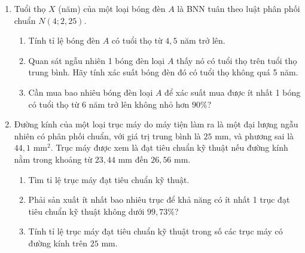 \documentclass[12pt,a4paper]{article}
\theoremstyle{definition}
\begin{document}
\begin{enumerate}[label=\textbf{\arabic*.}]
    \item Tuổi thọ $X$ (năm) của một loại bóng đèn $A$ là BNN tuân theo luật phân phối chuẩn $N(4; 2{,}25)$.
    \begin{enumerate}[label=\alph*.]
        \item Tính tỉ lệ bóng đèn $A$ có tuổi thọ từ $4{,}5$ năm trở lên.
        \item Quan sát ngẫu nhiên 1 bóng đèn loại $A$ thấy nó có tuổi thọ trên tuổi thọ trung bình. Hãy tính xác suất bóng đèn đó có tuổi thọ không quá 5 năm.
        \item Cần mua bao nhiêu bóng đèn loại $A$ để xác suất mua được ít nhất 1 bóng có tuổi thọ từ 6 năm trở lên không nhỏ hơn $90\%$?
    \end{enumerate}

    \item Đường kính của một loại trục máy do máy tiện làm ra là một đại lượng ngẫu nhiên có phân phối chuẩn, với giá trị trung bình là $25\text{ mm}$, và phương sai là $44{,}1\text{ mm}^2$. Trục máy được xem là đạt tiêu chuẩn kỹ thuật nếu đường kính nằm trong khoảng từ $23{,}44\text{ mm}$ đến $26{,}56\text{ mm}$.
    \begin{enumerate}[label=\arabic*)]
        \item Tìm tỉ lệ trục máy đạt tiêu chuẩn kỹ thuật.
        \item Phải sản xuất ít nhất bao nhiêu trục để khả năng có ít nhất 1 trục đạt tiêu chuẩn kỹ thuật không dưới $99{,}73\%$?
        \item Tính tỉ lệ trục máy đạt tiêu chuẩn kỹ thuật trong số các trục máy có đường kính trên $25\text{ mm}$.
    \end{enumerate}
\end{enumerate}
\end{document}
